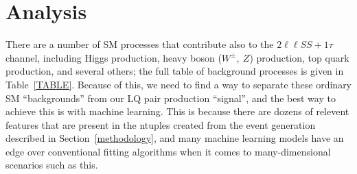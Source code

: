 \section{Analysis}
    There are a number of SM processes that contribute also to the $2\ell\ell SS + 1\tau$ channel, including Higgs production, heavy boson ($W^{\pm},\ Z$) production, top quark production, and several others; the full table of background processes is given in Table~\ref{TABLE}. Because of this, we need to find a way to separate these ordinary SM ``backgrounds'' from our LQ pair production ``signal'', and the best way to achieve this is with machine learning. This is because there are dozens of relevent features that are present in the ntuples created from the event generation described in Section~\ref{methodology}, and many machine learning models have an edge over conventional fitting algorithms when it comes to many-dimensional scenarios such as this.